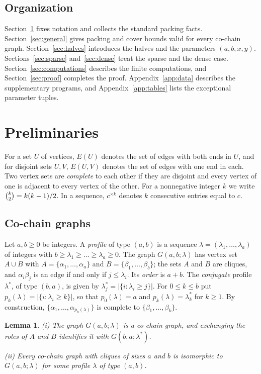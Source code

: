 \documentclass{amsart}
\newtheorem{lemma}[theorem]{Lemma}
\theoremstyle{definition}
\numberwithin{equation}{section}
\numberwithin{table}{section}
\newcommand{\binomtwo}[1]{\tbinom{#1}{2}}
\newcommand{\rep}[2]{#1^{\times #2}}
\begin{document}
\subsection*{Organization}
Section~\ref{sec:prelim} fixes notation and collects the standard packing facts. Section~\ref{sec:general} gives packing and cover bounds valid for every co-chain graph. Section~\ref{sec:halves} introduces the halves and the parameters $(a,b,x,y)$. Sections~\ref{sec:sparse} and~\ref{sec:dense} treat the sparse and the dense case. Section~\ref{sec:computations} describes the finite computations, and Section~\ref{sec:proof} completes the proof. Appendix~\ref{app:data} describes the supplementary programs, and Appendix~\ref{app:tables} lists the exceptional parameter tuples.

\section{Preliminaries}\label{sec:prelim}

For a set $U$ of vertices, $E(U)$ denotes the set of edges with both ends in $U$, and for disjoint sets $U,V$, $E(U,V)$ denotes the set of edges with one end in each. Two vertex sets are \emph{complete} to each other if they are disjoint and every vertex of one is adjacent to every vertex of the other. For a nonnegative integer $k$ we write $\binomtwo{k}=k(k-1)/2$. In a sequence, $\rep{c}{k}$ denotes $k$ consecutive entries equal to $c$.

\subsection{Co-chain graphs}
Let $a,b\ge 0$ be integers. A \emph{profile} of type $(a,b)$ is a sequence $\lambda=(\lambda_1,\dots,\lambda_a)$ of integers with $b\ge\lambda_1\ge\dots\ge\lambda_a\ge 0$. The graph $G(a,b;\lambda)$ has vertex set $A\cup B$ with $A=\{\alpha_1,\dots,\alpha_a\}$ and $B=\{\beta_1,\dots,\beta_b\}$; the sets $A$ and $B$ are cliques, and $\alpha_i\beta_j$ is an edge if and only if $j\le\lambda_i$. Its \emph{order} is $a+b$. The \emph{conjugate} profile $\lambda^*$, of type $(b,a)$, is given by $\lambda^*_j=|\{i:\lambda_i\ge j\}|$. For $0\le k\le b$ put $p_k(\lambda)=|\{i:\lambda_i\ge k\}|$, so that $p_0(\lambda)=a$ and $p_k(\lambda)=\lambda^*_k$ for $k\ge 1$. By construction, $\{\alpha_1,\dots,\alpha_{p_k(\lambda)}\}$ is complete to $\{\beta_1,\dots,\beta_k\}$.

\begin{lemma}\label{lem:representation}
\textup{(i)} The graph $G(a,b;\lambda)$ is a co-chain graph, and exchanging the roles of $A$ and $B$ identifies it with $G(b,a;\lambda^*)$.

\textup{(ii)} Every co-chain graph with cliques of sizes $a$ and $b$ is isomorphic to $G(a,b;\lambda)$ for some profile $\lambda$ of type $(a,b)$.
\end{lemma}
\end{document}

